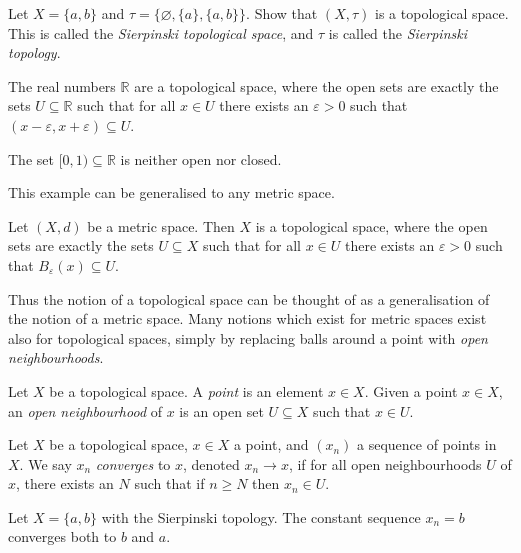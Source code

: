 \documentclass[a4paper,11pt]{article}
\begin{document}
    \begin{exercise}
      Let \(X = \{a, b\}\) and \(\tau = \{\varnothing, \{a\}, \{a,b\}\}\). Show that \((X, \tau)\) is a topological space. This is called the \emph{Sierpinski topological space}, and \(\tau\) is called the \emph{Sierpinski topology}.
    \end{exercise}

    \begin{example}
      The real numbers \(\mathbb{R}\) are a topological space, where the open sets are exactly the sets \(U \subseteq \mathbb{R}\) such that for all \(x \in U\) there exists an \(\varepsilon > 0\) such that \((x - \varepsilon, x + \varepsilon) \subseteq U\).

      The set \([0,1) \subseteq \mathbb{R}\) is neither open nor closed.
    \end{example}

    This example can be generalised to any metric space.

    \begin{example}
      Let \((X, d)\) be a metric space. Then \(X\) is a topological space, where the open sets are exactly the sets \(U \subseteq X\) such that for all \(x \in U\) there exists an \(\varepsilon > 0\) such that \(B_{\varepsilon}(x) \subseteq U\).
    \end{example}

    Thus the notion of a topological space can be thought of as a generalisation of the notion of a metric space. Many notions which exist for metric spaces exist also for topological spaces, simply by replacing balls around a point with \textit{open neighbourhoods}.

    \begin{definition}
    Let \(X\) be a topological space. A \emph{point} is an element \(x \in X\). Given a point \(x \in X\), an \emph{open neighbourhood} of \(x\) is an open set \(U \subseteq X\) such that \(x \in U\).
    \end{definition}

    \begin{example}
      Let \(X\) be a topological space, \(x \in X\) a point, and \((x_n)\) a sequence of points in \(X\). We say \(x_n\) \emph{converges} to \(x\), denoted \(x_n \to x\), if for all open neighbourhoods \(U\) of \(x\), there exists an \(N\) such that if \(n \ge N\) then \(x_n \in U\).
    \end{example}

    \begin{example}
      Let \(X = \{a,b\}\) with the Sierpinski topology. The constant sequence \(x_n = b\) converges both to \(b\) and \(a\).
    \end{example}
\end{document}
